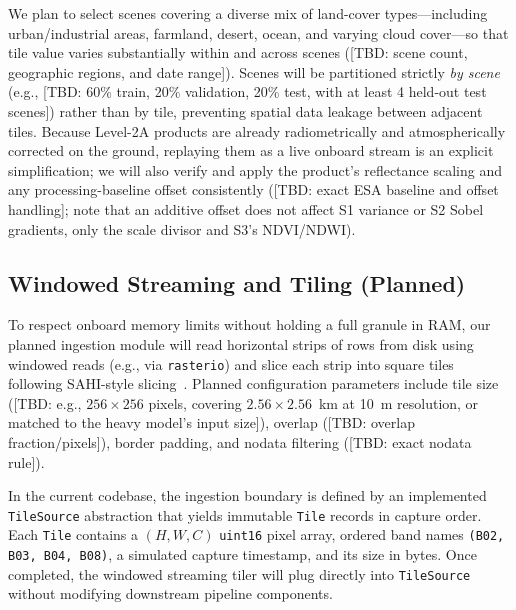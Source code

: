 \documentclass[conference]{IEEEtran}
\begin{document}
We plan to select scenes covering a diverse mix of land-cover types---including urban/industrial areas, farmland, desert, ocean, and varying cloud cover---so that tile value varies substantially within and across scenes ([TBD: scene count, geographic regions, and date range]). Scenes will be partitioned strictly \emph{by scene} (e.g., [TBD: 60\% train, 20\% validation, 20\% test, with at least 4 held-out test scenes]) rather than by tile, preventing spatial data leakage between adjacent tiles. Because Level-2A products are already radiometrically and atmospherically corrected on the ground, replaying them as a live onboard stream is an explicit simplification; we will also verify and apply the product's reflectance scaling and any processing-baseline offset consistently ([TBD: exact ESA baseline and offset handling]; note that an additive offset does not affect S1 variance or S2 Sobel gradients, only the scale divisor and S3's NDVI/NDWI).

\subsection{Windowed Streaming and Tiling (Planned)}
To respect onboard memory limits without holding a full granule in RAM, our planned ingestion module will read horizontal strips of rows from disk using windowed reads (e.g., via \texttt{rasterio}) and slice each strip into square tiles following SAHI-style slicing~\cite{sahi}. Planned configuration parameters include tile size ([TBD: e.g., $256\times256$ pixels, covering $2.56\times2.56$~km at 10~m resolution, or matched to the heavy model's input size]), overlap ([TBD: overlap fraction/pixels]), border padding, and nodata filtering ([TBD: exact nodata rule]).

In the current codebase, the ingestion boundary is defined by an implemented \texttt{TileSource} abstraction that yields immutable \texttt{Tile} records in capture order. Each \texttt{Tile} contains a $(H, W, C)$ \texttt{uint16} pixel array, ordered band names \texttt{(B02, B03, B04, B08)}, a simulated capture timestamp, and its size in bytes. Once completed, the windowed streaming tiler will plug directly into \texttt{TileSource} without modifying downstream pipeline components.
\end{document}
